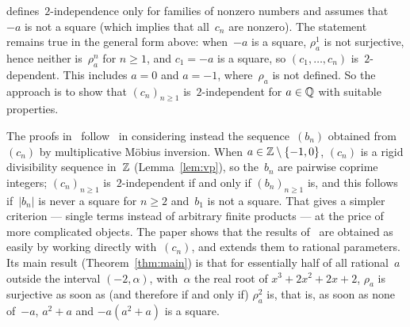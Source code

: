 \cite{paper} defines~$2$-independence only for families of nonzero numbers and assumes that~$-a$
is not a square (which implies that all~$c_n$ are nonzero). The statement remains true in the
general form above: when~$-a$ is a square, $\rho^1_a$ is not surjective, hence neither
is~$\rho^n_a$ for $n \ge 1$, and $c_1 = -a$ is a square, so $(c_1, \dots, c_n)$ is~$2$-dependent.
This includes $a = 0$ and $a = -1$, where~$\rho_a$ is not defined. So the approach is to show
that $(c_n)_{n \ge 1}$ is~$2$-independent for $a \in \mathbb{Q}$ with suitable properties.

The proofs in~\cite{paper, li2020, li2021} follow~\cite{odoni} in considering instead the
sequence~$(b_n)$ obtained from~$(c_n)$ by multiplicative Möbius inversion. When
$a \in \mathbb{Z} \setminus \{-1, 0\}$, $(c_n)$ is a rigid divisibility sequence in~$\mathbb{Z}$
(Lemma~\ref{lem:vp}), so the~$b_n$ are pairwise coprime integers; $(c_n)_{n \ge 1}$
is~$2$-independent if and only if $(b_n)_{n \ge 1}$ is, and this follows if~$|b_n|$ is never a
square for $n \ge 2$ and~$b_1$ is not a square. That gives a simpler criterion --- single terms
instead of arbitrary finite products --- at the price of more complicated objects. The paper
shows that the results of~\cite{paper, li2020, li2021} are obtained as easily by working
directly with~$(c_n)$, and extends them to rational parameters. Its main result
(Theorem~\ref{thm:main}) is that for essentially half of all rational~$a$ outside the interval
$(-2, \alpha)$, with~$\alpha$ the real root of $x^3 + 2x^2 + 2x + 2$, $\rho_a$ is surjective as
soon as (and therefore if and only if) $\rho_a^2$ is, that is, as soon as none of~$-a$,
$a^2 + a$ and $-a(a^2 + a)$ is a square.

